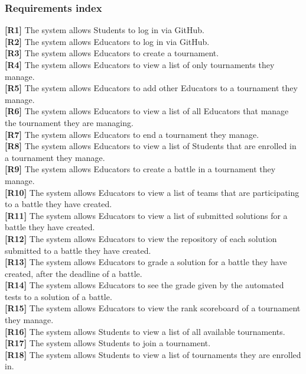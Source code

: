 \documentclass{article}
\begin{document}
\subsubsection{Requirements index}
\textbf{[R1]} The system allows Students to log in via GitHub.\\
\textbf{[R2]} The system allows Educators to log in via GitHub.\\
\textbf{[R3]} The system allows Educators to create a tournament.\\
\textbf{[R4]} The system allows Educators to view a list of only tournaments they manage.\\
\textbf{[R5]} The system allows Educators to add other Educators to a tournament they manage.\\
\textbf{[R6]} The system allows Educators to view a list of all Educators that manage the tournament they are managing.\\
\textbf{[R7]} The system allows Educators to end a tournament they manage.\\
\textbf{[R8]} The system allows Educators to view a list of Students that are enrolled in a tournament they manage.\\
\textbf{[R9]} The system allows Educators to create a battle in a tournament they manage.\\
\textbf{[R10]} The system allows Educators to view a list of teams that are participating to a battle they have created.\\
\textbf{[R11]} The system allows Educators to view a list of submitted solutions for a battle they have created.\\
\textbf{[R12]} The system allows Educators to view the repository of each solution submitted to a battle they have created.\\
\textbf{[R13]} The system allows Educators to grade a solution for a battle they have created, after the deadline of a battle.\\
\textbf{[R14]} The system allows Educators to see the grade given by the automated tests to a solution of a battle.\\
\textbf{[R15]} The system allows Educators to view the rank scoreboard of a tournament they manage.\\
\textbf{[R16]} The system allows Students to view a list of all available tournaments.\\
\textbf{[R17]} The system allows Students to join a tournament.\\
\textbf{[R18]} The system allows Students to view a list of tournaments they are enrolled in.\\
\end{document}
